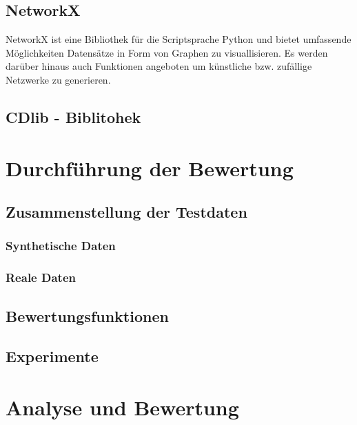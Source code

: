 \section{NetworkX}\label{NetworkX}
NetworkX ist eine Bibliothek für die Scriptsprache Python und bietet umfassende Möglichkeiten Datensätze in Form von Graphen zu visuallisieren. Es werden darüber hinaus auch Funktionen angeboten um künstliche bzw. zufällige Netzwerke zu generieren.

\section{CDlib - Biblitohek}\label{CDlib - Bibliothek}

\chapter{Durchführung der Bewertung}

\section{Zusammenstellung der Testdaten}\label{Zusammenstellung der Testdaten}

\subsection{Synthetische Daten}\label{Synthetische Daten}

\subsection{Reale Daten}\label{Reale Daten}

\section{Bewertungsfunktionen}\label{Bewertungsfunktionen}

\section{Experimente}\label{Experimente}

\chapter{Analyse und Bewertung}


